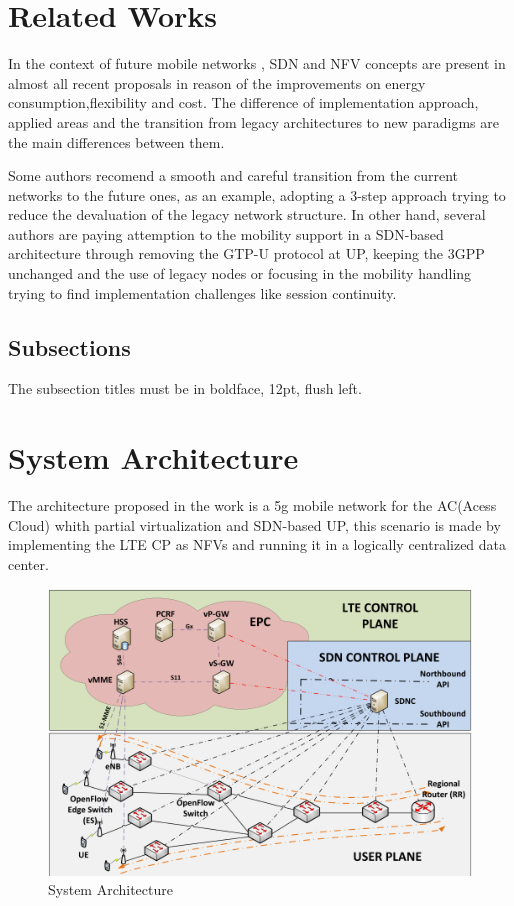 \documentclass[12pt]{article}
\begin{document}
\section{Related Works}

In the context of future mobile networks , SDN and NFV concepts are present in almost all recent proposals in reason of the improvements on energy consumption,flexibility and cost. The difference of implementation approach, applied areas and the transition from legacy architectures to new paradigms are the main differences between them.

Some authors recomend a smooth and careful transition from the current networks to the future ones, as an example, adopting a 3-step approach trying to reduce the devaluation of the legacy network structure. In other hand, several authors are paying attemption to the mobility support in a SDN-based architecture through removing the  GTP-U protocol at UP, keeping the 3GPP unchanged and the use of legacy nodes or focusing in the mobility handling trying to find implementation challenges like session continuity. 

\subsection{Subsections}

The subsection titles must be in boldface, 12pt, flush left.

\section{System Architecture}

The architecture proposed in the work is a 5g mobile network for the AC(Acess Cloud) whith partial virtualization and SDN-based UP, this scenario is made by implementing the LTE CP as NFVs and running it in a logically centralized data center.

\begin{figure}[ht]
\centering
\includegraphics[width=.7\textwidth]{figurejamelly.png}
\caption{System Architecture}
\label{figure 4: System Architecture}
\end{figure}
\end{document}
